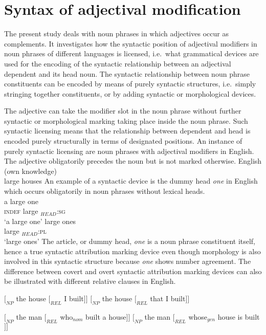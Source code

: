 \section{Syntax of adjectival modification}

The present study deals with noun phrases in which adjectives occur as complements. It investigates how the syntactic position of adjectival modifiers in noun phrases of different languages is licensed, i.e.~what grammatical devices are used for the encoding of the syntactic relationship between an adjectival dependent and its head noun. The syntactic relationship between noun phrase constituents can be encoded by means of purely syntactic structures, i.e.~simply stringing together constituents, or by adding syntactic or morphological devices.%

The adjective can take the modifier slot in the noun phrase without further syntactic or morphological marking taking place inside the noun phrase. Such syntactic licensing means that the relationship between dependent and head is encoded purely structurally in terms of designated positions. An instance of purely syntactic licensing are noun phrases with adjectival modifiers in English. The adjective obligatorily precedes the noun but is not marked otherwise.
\ea 
{\rm English (own knowledge)}\\
large houses%
\z
An example of a syntactic device is the dummy head \textit{one} in English which occurs obligatorily in noun phrases without lexical heads.
\eal
{}\\
\gll 	a large one\\
   	\textsc{indef} large $_{HEAD}$\textsc{:sg}\\
\glt ‘a large one’
\ex
\gll	large ones\\
    	large $_{HEAD}$\textsc{:pl}\\
\glt ‘large ones’
\zl
The article, or dummy head, \textit{one} is a noun phrase constituent itself, hence a true syntactic attribution marking device even though morphology is also involved in this syntactic structure because \textit{one} shows number agreement. The difference between covert and overt syntactic attribution marking devices can also be illustrated with different relative clauses in English.
\begin{exe}%
\begin{xlist}
\ex $[_{NP}$ the house $[_{REL}$ I built$]]$ \label{engrelap}
\ex $[_{NP}$ the house $[_{REL}$ that I built$]]$ \label{engrel1}
\begin{xlist}
\ex $[_{NP}$ the man $[_{REL}$ who$_{nom}$ built a house$]]$ \label{engrel2a}
\ex $[_{NP}$ the man $[_{REL}$ whose$_{gen}$ house is built$]]$ \label{engrel2b}
\end{xlist}
\end{xlist}
\end{exe}
